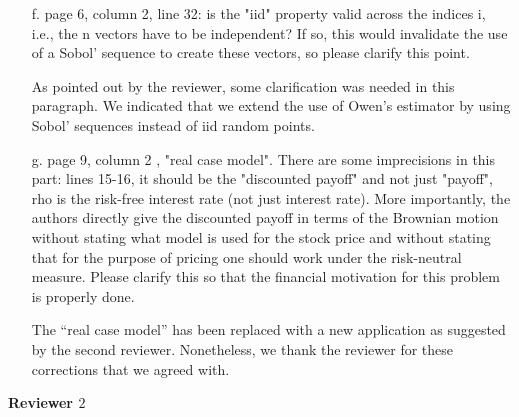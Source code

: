 \documentclass[10pt,a4paper]{article}
\newcommand{\answer}[1]{{\color{blue} #1 }}
\begin{document}
\begin{itemize}
\item[f.] page 6, column 2, line 32: is the "iid" property valid across the indices i, i.e., the n vectors have to be independent? If so, this would invalidate the use of a Sobol' sequence to create these vectors, so please clarify this point.

\answer{As pointed out by the reviewer, some clarification was needed in this paragraph. We indicated that we extend the use of  Owen's estimator by using Sobol' sequences instead of iid random points.}

\item[g.] page 9, column 2 , "real case model". There are some imprecisions in this part: lines 15-16, it should be the "discounted payoff" and not just "payoff", rho is the risk-free interest rate (not just interest rate). More importantly, the authors directly give the discounted payoff in terms of the Brownian motion without stating what model is used for the stock price and without stating that for the purpose of pricing one should work under the risk-neutral measure. Please clarify this so that the financial motivation for this problem is properly done.

{\color{blue} The ``real case model'' has been replaced with a new application as suggested by the second reviewer. Nonetheless, we thank the reviewer for these corrections that we agreed with.} 
\end{itemize}

\textbf{\large{Reviewer $2$}}
\vspace*{0.5cm}
\end{document}
